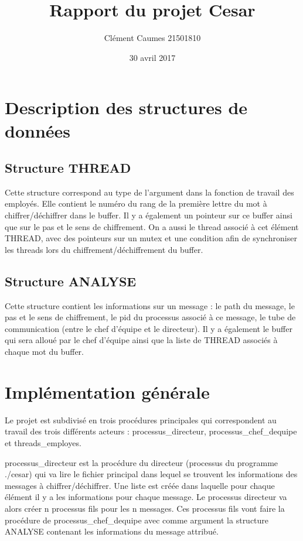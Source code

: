\documentclass[a4]{article}
\author{Clément Caumes 21501810}
\title{Rapport du projet Cesar}
\date{30 avril 2017}
\begin{document}
\maketitle

\section{Description des structures de données}
\subsection{Structure THREAD}
Cette structure correspond au type de l'argument dans la fonction de travail des employés. 
Elle contient le numéro du rang de la première lettre du mot à chiffrer/déchiffrer dans le buffer. 
Il y a également un pointeur sur ce buffer ainsi que sur le pas et le sens de chiffrement. 
On a aussi le thread associé à cet élément THREAD, avec des pointeurs sur un mutex et une condition afin de 
synchroniser les threads lors du chiffrement/déchiffrement du buffer. 

\subsection{Structure ANALYSE}
Cette structure contient les informations sur un message : le path du message, le pas et le sens de chiffrement, 
le pid du processus associé à ce message, le tube de communication (entre le chef d'équipe et le directeur). 
Il y a également le buffer qui sera alloué par le chef d'équipe ainsi que la liste de THREAD associés à chaque mot du buffer. 

\section{Implémentation générale}
Le projet est subdivisé en trois procédures principales qui correspondent au 
travail des trois différents acteurs : processus\_directeur, processus\_chef\_dequipe et threads\_employes.\newline

processus\_directeur est la procédure du directeur (processus du programme ./cesar) 
qui va lire le fichier principal dans lequel se trouvent les informations des messages 
à chiffrer/déchiffrer.\newline
Une liste est créée dans laquelle pour chaque élément il y a les informations pour chaque message. 
Le processus directeur va alors créer n processus fils pour les n messages. 
Ces processus fils vont faire la procédure de processus\_chef\_dequipe avec 
comme argument la structure ANALYSE contenant les informations du message attribué. \newline \newline
\end{document}
